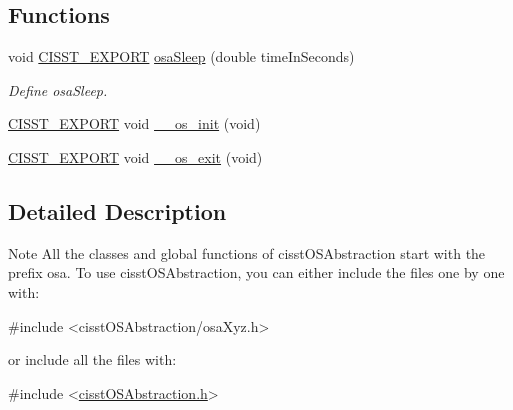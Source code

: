 \subsection*{Functions}
\begin{DoxyCompactItemize}
\item 
void \hyperlink{cmn_export_macros_8h_a99393e0c3ac434b2605235bbe20684f8}{C\-I\-S\-S\-T\-\_\-\-E\-X\-P\-O\-R\-T} \hyperlink{group__cisst_o_s_abstraction_ga54ab2658f0c75b6004c12c11d96f2e00}{osa\-Sleep} (double time\-In\-Seconds)
\begin{DoxyCompactList}\small\item\em Define osa\-Sleep. \end{DoxyCompactList}\item 
\hyperlink{cmn_export_macros_8h_a99393e0c3ac434b2605235bbe20684f8}{C\-I\-S\-S\-T\-\_\-\-E\-X\-P\-O\-R\-T} void \hyperlink{group__cisst_o_s_abstraction_gae5841775264a0bce1dc3e04ed9049f62}{\-\_\-\-\_\-os\-\_\-init} (void)
\item 
\hyperlink{cmn_export_macros_8h_a99393e0c3ac434b2605235bbe20684f8}{C\-I\-S\-S\-T\-\_\-\-E\-X\-P\-O\-R\-T} void \hyperlink{group__cisst_o_s_abstraction_gacc130f6821ff63dd4281f663837649e9}{\-\_\-\-\_\-os\-\_\-exit} (void)
\end{DoxyCompactItemize}


\subsection{Detailed Description}
\begin{DoxyNote}{Note}
All the classes and global functions of cisst\-O\-S\-Abstraction start with the prefix osa. To use cisst\-O\-S\-Abstraction, you can either include the files one by one with\-: 
\begin{DoxyCode}
\textcolor{preprocessor}{#include <cisstOSAbstraction/osaXyz.h>}
\end{DoxyCode}
 or include all the files with\-: 
\begin{DoxyCode}
\textcolor{preprocessor}{#include <\hyperlink{cisst_o_s_abstraction_8h}{cisstOSAbstraction.h}>}
\end{DoxyCode}
 
\end{DoxyNote}


